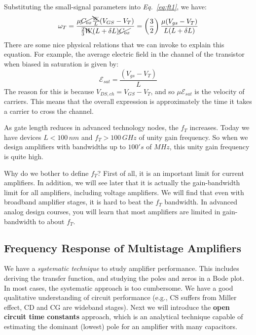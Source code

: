 Substituting the small-signal parameters into \emph{Eq.~\ref{eq:ft1}}, we have:
    \begin{equation} 
        \omega_T = \frac{\mu\cancel{C_{ox}}\frac{\bcancel{W}}{L}(V_{GS} - V_T)}{\frac{2}{3}\bcancel{W}(L + \delta L)\cancel{C_{ox}}}
        = \left(\frac{3}{2}\right)\frac{\mu(V_{gs} - V_T)}{L(L+\delta L)}
        \label{eq:ft2}
    \end{equation}
There are some nice physical relations that we can invoke to explain this equation.  For example, the average electric field in the channel of the transistor when biased in saturation is given by:
    \begin{equation}
        \mathcal{E}_{sat} = \frac{(V_{gs} - V_T)}{L}
    \end{equation}
The reason for this is because $V_{DS,ch} = V_{GS} - V_T$, and so $\mu\mathcal{E}_{sat}$ is the velocity of carriers.  This means that the overall expression is approximately the time it takes a carrier to cross the channel.  

As gate length reduces in advanced technology nodes, the $f_T$ increases.  Today we have devices $L < 100\,nm$ and $f_T > 100\,GHz$ of unity gain frequency.  So when we design amplifiers with bandwidths up to $100's$ of $MHz$, this unity gain frequency is quite high.

Why do we bother to define $f_T$?  First of all, it is an important limit for current amplifiers.  In addition, we will see later that it is actually the gain-bandwidth limit for all amplifiers, including voltage amplifiers.  We will find that even with broadband amplifier stages, it is hard to beat the $f_T$ bandwidth.  In advanced analog design courses, you will learn that most amplifiers are limited in gain-bandwidth to about $f_T$. 
\subsection{Frequency Response of Multistage Amplifiers}
We have a \textit{systematic technique} to study amplifier performance.  This includes deriving the transfer function, and studying the poles and zeros in a Bode plot.  In most cases, the systematic approach is too cumbersome. We have a good qualitative understanding of circuit performance (e.g., CS suffers from Miller effect, CD and CG are wideband stages).  Next we will introduce the \textbf{open circuit time constants} approach, which is an analytical technique capable of estimating  the dominant (lowest) pole for an amplifier with many capacitors.
\newpage
